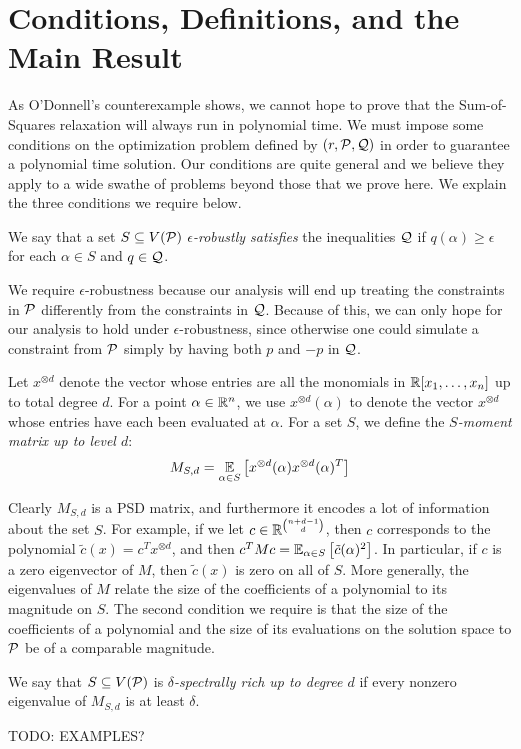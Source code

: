 \section{Conditions, Definitions, and the Main Result}
As O'Donnell's counterexample shows, we cannot hope to prove that the Sum-of-Squares relaxation will always run in polynomial time. We must impose some conditions on the optimization problem defined by $(r, \mathcal P, \mathcal Q)$ in order to guarantee a polynomial time solution. Our conditions are quite general and we believe they apply to a wide swathe of problems beyond those that we prove here. We explain the three conditions we require below.

\begin{definition}
We say that a set $S \subseteq V(\mathcal P)$ \emph{$\epsilon$-robustly satisfies} the inequalities $\mathcal Q$ if $q(\alpha) \geq \epsilon$ for each $\alpha \in S$ and $q \in \mathcal Q$. 
\end{definition}
We require $\epsilon$-robustness because our analysis will end up treating the constraints in $\mathcal P$ differently from the constraints in $\mathcal Q$.
Because of this, we can only hope for our analysis to hold under $\epsilon$-robustness, since otherwise one could simulate a constraint from $\mathcal P$ simply by having both $p$ and $-p$ in $\mathcal Q$. 

\begin{definition}
Let $x^{\otimes d}$ denote the vector whose entries are all the monomials in $\mathbb R[x_1,\dots,x_n]$ up to total degree $d$. 
For a point $\alpha \in \mathbb R^n$, we use $x^{\otimes d}(\alpha)$ to denote the vector $x^{\otimes d}$ whose entries have each been evaluated at $\alpha$.
For a set $S$, we define the \emph{$S$-moment matrix up to level $d$}:
\[M_{S,d} = \operatorname*{\mathbb{E}}_{\alpha \in S}\left[x^{\otimes d}(\alpha)x^{\otimes d}(\alpha)^T\right]\]
\end{definition}
Clearly $M_{S,d}$ is a PSD matrix, and furthermore it encodes a lot of information about the set $S$. For example, if we let $c \in \mathbb R^{\binom{n+d-1}{d}}$, then $c$ corresponds to the polynomial $\tilde{c}(x) = c^Tx^{\otimes d}$, and then $c^TMc = \operatorname*{\mathbb{E}}_{\alpha \in S}\left[\tilde{c}(\alpha)^2\right]$.
In particular, if $c$ is a zero eigenvector of $M$, then $\tilde{c}(x)$ is zero on all of $S$. 
More generally, the eigenvalues of $M$ relate the size of the coefficients of a polynomial to its magnitude on $S$. 
The second condition we require is that the size of the coefficients of a polynomial and the size of its evaluations on the solution space to $\mathcal P$ be of a comparable magnitude.
\begin{definition}
We say that $S \subseteq V(\mathcal P)$ is \emph{$\delta$-spectrally rich up to degree $d$} if every nonzero eigenvalue of $M_{S,d}$ is at least $\delta$. 
\end{definition}
TODO: EXAMPLES?

